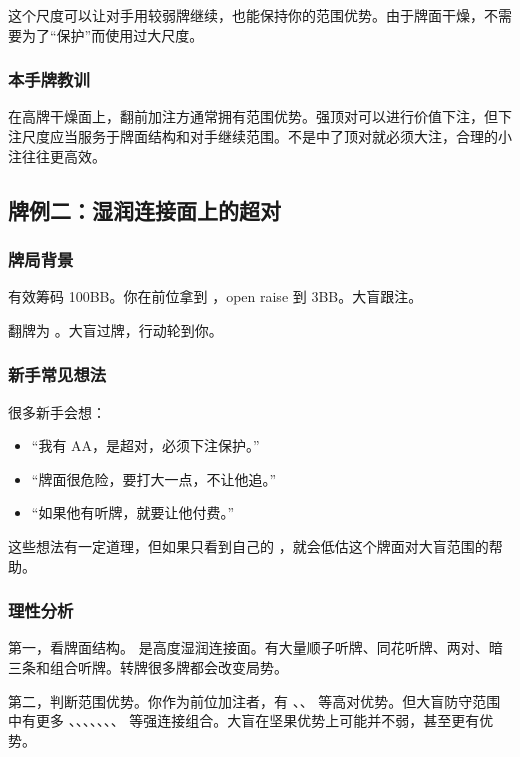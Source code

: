 这个尺度可以让对手用较弱牌继续，也能保持你的范围优势。由于牌面干燥，不需要为了“保护”而使用过大尺度。

\subsubsection*{本手牌教训}

在高牌干燥面上，翻前加注方通常拥有范围优势。强顶对可以进行价值下注，但下注尺度应当服务于牌面结构和对手继续范围。不是中了顶对就必须大注，合理的小注往往更高效。

\subsection{牌例二：湿润连接面上的超对}

\subsubsection*{牌局背景}

有效筹码 100BB。你在前位拿到 ，open raise 到 3BB。大盲跟注。

翻牌为 。大盲过牌，行动轮到你。

\subsubsection*{新手常见想法}

很多新手会想：

\begin{itemize}
\item “我有 AA，是超对，必须下注保护。”
\item “牌面很危险，要打大一点，不让他追。”
\item “如果他有听牌，就要让他付费。”
\end{itemize}

这些想法有一定道理，但如果只看到自己的 ，就会低估这个牌面对大盲范围的帮助。

\subsubsection*{理性分析}

第一，看牌面结构。 是高度湿润连接面。有大量顺子听牌、同花听牌、两对、暗三条和组合听牌。转牌很多牌都会改变局势。

第二，判断范围优势。你作为前位加注者，有 、、 等高对优势。但大盲防守范围中有更多 、、、、、、、 等强连接组合。大盲在坚果优势上可能并不弱，甚至更有优势。

